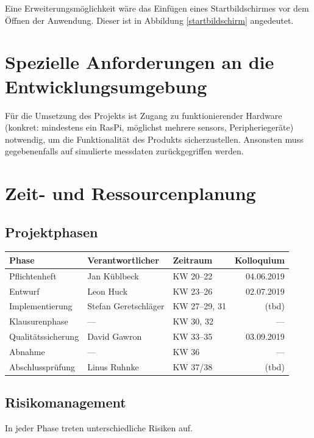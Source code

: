 \documentclass[parskip=full]{scrartcl}
\begin{document}
Eine Erweiterungsmöglichkeit wäre das Einfügen eines Startbildschirmes vor dem Öffnen der Anwendung. Dieser ist in Abbildung \ref{startbildschirm} angedeutet.

\section{Spezielle Anforderungen an die Entwicklungsumgebung}\label{entwicklungsumgebung}

Für die Umsetzung des Projekts ist Zugang zu funktionierender Hardware (konkret: mindestens ein \gls{RasPi}, möglichst mehrere \glspl{sensor}, Peripheriegeräte) notwendig, um die Funktionalität des Produkts sicherzustellen.\newline
Ansonsten muss gegebenenfalls auf simulierte \gls{messdaten} zurückgegriffen werden.

\section{Zeit- und Ressourcenplanung}\label{zeit}

\subsection{Projektphasen}

\begin{tabular}{| l | l | l | r |}
	\hline
	\textbf{Phase} & \textbf{Verantwortlicher} & \textbf{Zeitraum} & \textbf{Kolloquium} \\ \hline
	Pflichtenheft & Jan Küblbeck & KW 20–22 & 04.06.2019 \\
	Entwurf & Leon Huck & KW 23–26 & 02.07.2019 \\
	Implementierung & Stefan Geretschläger & KW 27–29, 31 & (tbd) \\
	Klausurenphase & — & KW 30, 32 & — \\
	Qualitätssicherung & David Gawron & KW 33–35 & 03.09.2019 \\
	Abnahme & — & KW 36 & — \\
	Abschlussprüfung & Linus Ruhnke & KW 37/38 & (tbd) \\
	\hline
\end{tabular}

\subsection{Risikomanagement}

In jeder Phase treten unterschiedliche Risiken auf.
\end{document}

